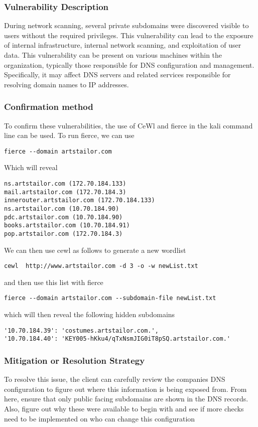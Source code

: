 \documentclass[notitlepage]{article}
\begin{document}
  	\subsubsection*{Vulnerability Description}
        During network scanning, several private subdomains were discovered visible to users without
        the required privileges. This vulnerability can lead to the exposure of internal infrastructure, internal network scanning, and exploitation of user data.
        This vulnerability can be present on various machines within the organization, typically those responsible for DNS configuration and management. Specifically, it may affect DNS servers and related services responsible for resolving domain names to IP addresses.
  		
  	\subsubsection*{Confirmation method}
            To confirm these vulnerabilities, the use of CeWl and fierce in the kali command line can be used.
            To run fierce, we can use 
\begin{verbatim}
fierce --domain artstailor.com
\end{verbatim}
        Which will reveal 
\begin{verbatim}
ns.artstailor.com (172.70.184.133)
mail.artstailor.com (172.70.184.3)
innerouter.artstailor.com (172.70.184.133)
ns.artstailor.com (10.70.184.90)
pdc.artstailor.com (10.70.184.90)
books.artstailor.com (10.70.184.91)
pop.artstailor.com (172.70.184.3)
\end{verbatim}
We can then use cewl as follows to generate a new  wordlist
\begin{verbatim}
cewl  http://www.artstailor.com -d 3 -o -w newList.txt
\end{verbatim}
and then use this list with fierce
\begin{verbatim}
fierce --domain artstailor.com --subdomain-file newList.txt
\end{verbatim}
      which will then reveal the following hidden subdomains
\begin{verbatim}
'10.70.184.39': 'costumes.artstailor.com.',
'10.70.184.40': 'KEY005-hKku4/qTxNsmJIG0iT8pSQ.artstailor.com.'
\end{verbatim}
		
    \subsubsection*{Mitigation or Resolution Strategy}
        To resolve this issue, the client can carefully review the companies DNS configuration to figure out where this information is being exposed from. From here, ensure that only public facing subdomains are shown in the DNS records. Also, figure out why these were available to begin with and see if more checks need to be implemented on who can change this configuration
\end{document}
